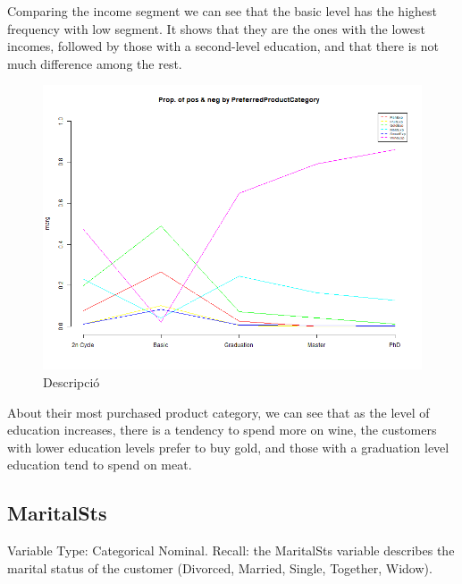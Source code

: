 Comparing the income segment we can see that the basic level has the highest frequency with low segment. It shows that they are the ones with the lowest incomes, followed by those with a second-level education, and that there is not much difference among the rest.
\begin{figure}[H]
    \centering
    \includegraphics[width= 1\linewidth]{Imatges/prop_cond_class_PreferredProductCategory_4_legend.png}
    \caption{Descripció}
    \label{fig:scree_plot_4} %
\end{figure}

About their most purchased product category, we can see that as the level of education increases, there is a tendency to spend more on wine, the customers with lower education levels prefer to buy gold, and those with a graduation level education tend to spend on meat.

\newpage
\subsection{MaritalSts}
Variable Type: Categorical Nominal. 
Recall: the MaritalSts variable describes the marital status of the customer (Divorced, Married, Single, Together, Widow).

